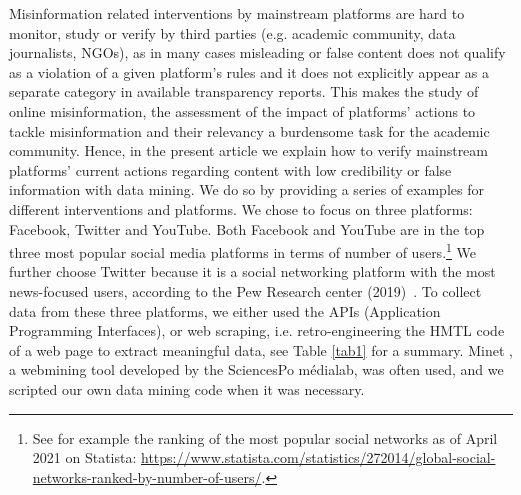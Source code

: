 \documentclass{article}
\begin{document}
Misinformation related interventions by mainstream platforms are hard to monitor, study or verify by third parties (e.g. academic community, data journalists, NGOs), as in many cases misleading or false content does not qualify as a violation of a given platform's rules and it does not explicitly appear as a separate category in available transparency reports. This makes the study of online misinformation, the assessment of the impact of platforms' actions to tackle misinformation and their relevancy a burdensome task for the academic community. Hence, in the present article we explain how to verify 
mainstream platforms' current actions regarding content with low credibility or false information
with data mining. We do so by providing a series of examples for different interventions and platforms. We chose to focus on three platforms: Facebook, Twitter and YouTube. Both Facebook and YouTube are in the top three most popular social media platforms in terms of number of users.\footnote{See for example the ranking of the most popular social networks as of April 2021 on Statista: \href{https://www.statista.com/statistics/272014/global-social-networks-ranked-by-number-of-users/}{https://www.statista.com/statistics/272014/global-social-networks-ranked-by-number-of-users/}.} We further choose Twitter because it is a social networking platform with the most news-focused users, according to the Pew Research center (2019)~\cite{pew1}. To collect data from these three platforms, we either used the APIs (Application Programming Interfaces), or web scraping, i.e. retro-engineering the HMTL code of a web page to extract meaningful data, see Table \ref{tab1} for a summary. Minet \cite{minet}, a webmining tool developed by the SciencesPo médialab, was often used, and we scripted our own data mining code when it was necessary.
\end{document}
